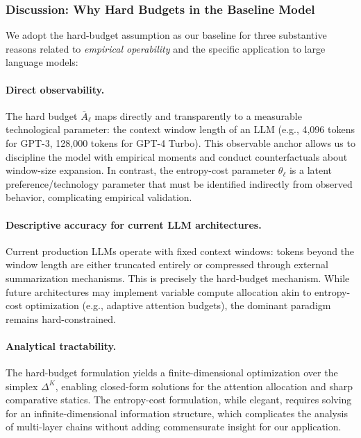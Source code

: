 \subsubsection{Discussion: Why Hard Budgets in the Baseline Model}

We adopt the hard-budget assumption as our baseline for three substantive reasons related to \emph{empirical operability} and the specific application to large language models:

\paragraph{Direct observability.} The hard budget $\bar{A}_\ell$ maps directly and transparently to a measurable technological parameter: the context window length of an LLM (e.g., 4,096 tokens for GPT-3, 128,000 tokens for GPT-4 Turbo). This observable anchor allows us to discipline the model with empirical moments and conduct counterfactuals about window-size expansion. In contrast, the entropy-cost parameter $\theta_\ell$ is a latent preference/technology parameter that must be identified indirectly from observed behavior, complicating empirical validation.

\paragraph{Descriptive accuracy for current LLM architectures.} Current production LLMs operate with fixed context windows: tokens beyond the window length are either truncated entirely or compressed through external summarization mechanisms. This is precisely the hard-budget mechanism. While future architectures may implement variable compute allocation akin to entropy-cost optimization (e.g., adaptive attention budgets), the dominant paradigm remains hard-constrained.

\paragraph{Analytical tractability.} The hard-budget formulation yields a finite-dimensional optimization over the simplex $\Delta^{K}$, enabling closed-form solutions for the attention allocation and sharp comparative statics. The entropy-cost formulation, while elegant, requires solving for an infinite-dimensional information structure, which complicates the analysis of multi-layer chains without adding commensurate insight for our application.

